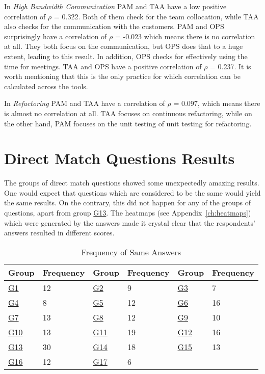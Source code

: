 In \textit{High Bandwidth Communication} \ac{PAM} and \ac{TAA} have a low positive correlation of $\rho$ = 0.322. Both of them check for the team collocation, while \ac{TAA} also checks for the communication with the customers. \ac{PAM} and \ac{OPS} surprisingly have a correlation of $\rho$ = -0.023 which means there is no correlation at all. They both focus on the communication, but \ac{OPS} does that to a huge extent, leading to this result. In addition, \ac{OPS} checks for effectively using the time for meetings. \ac{TAA} and \ac{OPS} have a positive correlation of $\rho$ = 0.237. It is worth mentioning that this is the only practice for which correlation can be calculated across the tools.

In \textit{Refactoring} \ac{PAM} and \ac{TAA} have a correlation of $\rho$ = 0.097, which means there is almost no correlation at all. \ac{TAA} focuses on continuous refactoring, while on the other hand, \ac{PAM} focuses on the unit testing of unit testing for refactoring.


\section{Direct Match Questions Results}
\label{sec:direct_match_results}

The groups of direct match questions showed some unexpectedly amazing results. One would expect that questions which are considered to be the same would yield the same results. On the contrary, this did not happen for any of the groups of questions, apart from group \hyperref[G13]{G13}. The heatmaps (see Appendix~\ref{ch:heatmaps}) which were generated by the answers made it crystal clear that the respondents' answers resulted in different scores. 

\begin{table} [H]
	\begin{tabular}{| p{1cm} | p{2cm} | p{1cm} | p{2cm} | p{1cm} | p{2cm} |} \hline
		Group & Frequency & Group & Frequency & Group & Frequency \\ \hline
		\hyperref[G1]{G1} & 12 & \hyperref[G2]{G2} & 9 & \hyperref[G3]{G3} & 7 \\ \hline
		\hyperref[G4]{G4} & 8 & \hyperref[G5]{G5} & 12 & \hyperref[G6]{G6} & 16 \\ \hline
		\hyperref[G7]{G7} & 13 & \hyperref[G8]{G8} & 12 & \hyperref[G9]{G9} & 10 \\ \hline
		\hyperref[G10]{G10} & 13 & \hyperref[G11]{G11} & 19 & \hyperref[G12]{G12} & 16 \\ \hline
		\hyperref[G13]{G13} & 30 & \hyperref[G14]{G14} & 18 & \hyperref[G15]{G15} & 13 \\ \hline
		\hyperref[G16]{G16} & 12 & \hyperref[G17]{G17} & 6 & & \\ \hline
	\end{tabular}
	\caption{Frequency of Same Answers}
	\label{table:answers_frequency}
\end{table}

